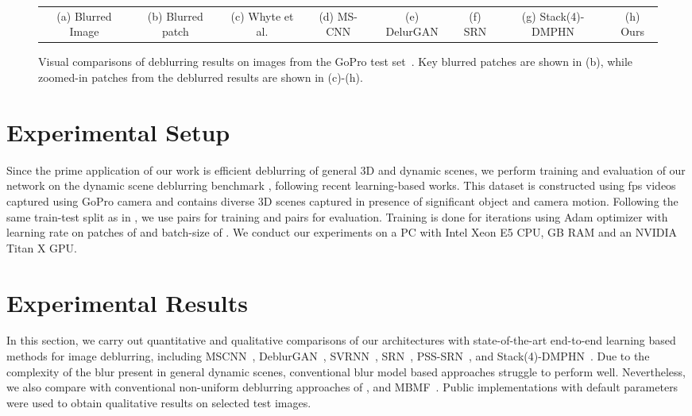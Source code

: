 \documentclass[letterpaper]{article} \usepackage{aaai20}  \usepackage{times}  \usepackage{helvet} \usepackage{courier}  \usepackage[hyphens]{url}  \usepackage{graphicx} \urlstyle{rm} \def\UrlFont{\rm}  \usepackage{graphicx}  \frenchspacing  \setlength{\pdfpagewidth}{8.5in}  \setlength{\pdfpageheight}{11in}
\begin{document}
\begin{figure*}[htb]
\begin{tabular}{cccccccc}
				\\ 				
								(a) Blurred Image&

				(b) Blurred patch& (c) Whyte et al. & (d) MS-CNN & (e) DelurGAN& (f) SRN & (g) \tiny{Stack(4)-DMPHN} & (h) Ours\\
	\end{tabular}
\caption{Visual comparisons of deblurring results on images from the GoPro test set~\cite{nah2017deep}. Key blurred patches are shown in (b), while zoomed-in patches from the deblurred results are shown in (c)-(h).}\label{fig:dynamic}
\end{figure*} 




\section{Experimental Setup}
\label{sec:experiments}



Since the prime application of our work is efficient deblurring of general 3D and dynamic scenes, we perform training and evaluation of our network on the dynamic scene deblurring benchmark \cite{nah2017deep}, following recent learning-based works. This dataset is constructed using fps videos captured using GoPro camera and contains diverse 3D scenes captured in presence of significant object and camera motion. Following the same train-test split as in \cite{nah2017deep}, we use  pairs for training and  pairs for evaluation. Training is done for  iterations using Adam optimizer with learning rate  on patches of  and batch-size of . We conduct our experiments on a PC with Intel Xeon E5 CPU,  GB RAM and an NVIDIA Titan X GPU.


\section{Experimental Results}

In this section, we carry out quantitative and qualitative comparisons of our architectures with state-of-the-art end-to-end learning based methods for image deblurring, including MSCNN~\cite{nah2017deep}, DeblurGAN~\cite{kupyn2017deblurgan}, SVRNN~\cite{zhang2018dynamic}, SRN~\cite{tao2018scale}, PSS-SRN~\cite{gao2019dynamic}, and Stack(4)-DMPHN~\cite{zhang2019deep}. Due to the complexity of the blur present in general dynamic scenes, conventional blur model based approaches struggle to perform well. Nevertheless, we also compare with conventional non-uniform deblurring approaches of \cite{whyte2012non}, \cite{hyun2013dynamic} and MBMF~\cite{gong2017motion}. Public implementations with default parameters were used to obtain qualitative results on selected test images.
\end{document}
